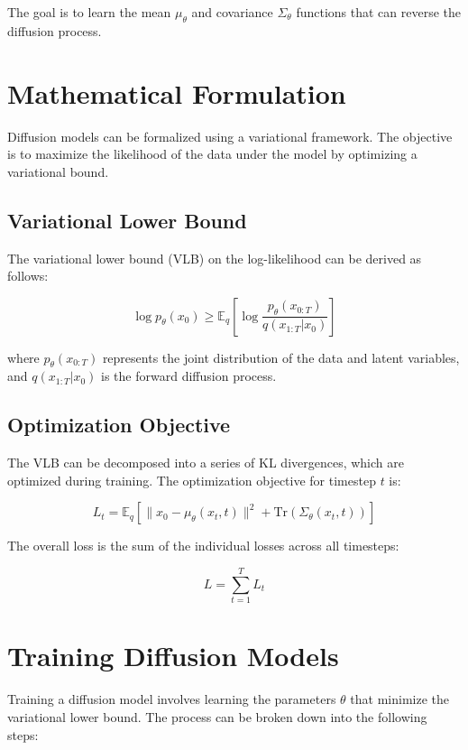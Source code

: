 The goal is to learn the mean \( \mu_\theta \) and covariance \( \Sigma_\theta \) functions that can reverse the diffusion process.

\section{Mathematical Formulation}
Diffusion models can be formalized using a variational framework. The objective is to maximize the likelihood of the data under the model by optimizing a variational bound.

\subsection{Variational Lower Bound}
The variational lower bound (VLB) on the log-likelihood can be derived as follows:

\begin{equation}
\log p_\theta(x_0) \geq \mathbb{E}_q \left[ \log \frac{p_\theta(x_{0:T})}{q(x_{1:T} | x_0)} \right]
\end{equation}

where \( p_\theta(x_{0:T}) \) represents the joint distribution of the data and latent variables, and \( q(x_{1:T} | x_0) \) is the forward diffusion process.

\subsection{Optimization Objective}
The VLB can be decomposed into a series of KL divergences, which are optimized during training. The optimization objective for timestep \( t \) is:

\begin{equation}
L_t = \mathbb{E}_q \left[ \| x_0 - \mu_\theta(x_t, t) \|^2 + \text{Tr}(\Sigma_\theta(x_t, t)) \right]
\end{equation}

The overall loss is the sum of the individual losses across all timesteps:

\begin{equation}
L = \sum_{t=1}^T L_t
\end{equation}

\section{Training Diffusion Models}
Training a diffusion model involves learning the parameters \( \theta \) that minimize the variational lower bound. The process can be broken down into the following steps:

